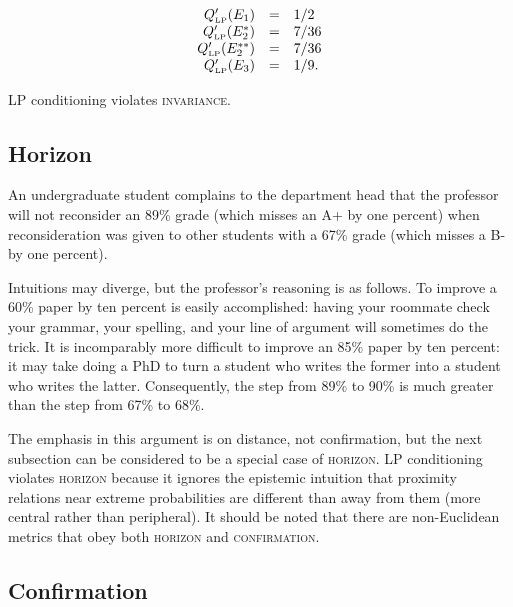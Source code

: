 \documentclass[11pt]{article}
\begin{document}
\begin{equation}
  \label{eq:marpleposteriorlp}
  \begin{array}{rcl}
  Q'_{\mbox{\tiny LP}}(E_{1})&=&1/2\\
  Q'_{\mbox{\tiny LP}}(E_{2}^{*})&=&7/36\\
  Q'_{\mbox{\tiny LP}}(E_{2}^{**})&=&7/36\\
  Q'_{\mbox{\tiny LP}}(E_{3})&=&1/9.
\end{array}
\end{equation}

LP conditioning violates \textsc{invariance}.

\subsection{Horizon}
\label{Horizon}

\begin{quotex}
  \label{ex:complaint} An
  undergraduate student complains to the department head that the
  professor will not reconsider an 89\% grade (which misses an A+ by
  one percent) when reconsideration was given to other students with a
  67\% grade (which misses a B- by one percent).
\end{quotex}

Intuitions may diverge, but the professor's reasoning is as follows.
To improve a 60\% paper by ten percent is easily accomplished: having
your roommate check your grammar, your spelling, and your line of
argument will sometimes do the trick. It is incomparably more
difficult to improve an 85\% paper by ten percent: it may take doing a
PhD to turn a student who writes the former into a student who writes
the latter. Consequently, the step from 89\% to 90\% is much greater
than the step from 67\% to 68\%.

The emphasis in this argument is on distance, not confirmation, but
the next subsection can be considered to be a special case of
\textsc{horizon}. LP conditioning violates \textsc{horizon} because it
ignores the epistemic intuition that proximity relations near extreme
probabilities are different than away from them (more central rather
than peripheral). It should be noted that there are non-Euclidean
metrics that obey both \textsc{horizon} and \textsc{confirmation}.

\subsection{Confirmation}
\label{Confirmation}
\end{document}
